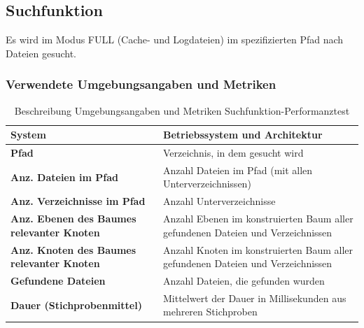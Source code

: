 \documentclass[a4paper,12pt]{report}
\begin{document}
    \subsection{Suchfunktion}\label{subsec:testduchfuhrung}
    Es wird im Modus FULL (Cache- und Logdateien) im spezifizierten Pfad nach Dateien gesucht.

    \subsubsection{Verwendete Umgebungsangaben und Metriken}\label{subsubsec:search-perftest-metrics-title}
    \begin{table}[h!]
        \centering
        \setlength{\leftmargini}{0.8cm}
        \begin{tabular}{|p{7cm}|p{7cm}|}
            \hline
            \textbf{System}                                            & Betriebssystem und Architektur                                                  \\ \hline
            \textbf{Pfad}                                              & Verzeichnis, in dem gesucht wird                                                \\ \hline
            \textbf{Anz. Dateien im Pfad}                              & Anzahl Dateien im Pfad (mit allen Unterverzeichnissen)                          \\ \hline
            \textbf{Anz. Verzeichnisse im Pfad}                        & Anzahl Unterverzeichnisse                                                       \\ \hline
            \textbf{Anz. Ebenen \newline des Baumes relevanter Knoten} & Anzahl Ebenen im konstruierten Baum aller gefundenen Dateien und Verzeichnissen \\ \hline
            \textbf{Anz. Knoten \newline des Baumes relevanter Knoten} & Anzahl Knoten im konstruierten Baum aller gefundenen Dateien und Verzeichnissen \\ \hline
            \textbf{Gefundene Dateien}                                 & Anzahl Dateien, die gefunden wurden                                             \\ \hline
            \textbf{Dauer (Stichprobenmittel)}                         & Mittelwert der Dauer in Millisekunden aus mehreren Stichproben                  \\ \hline
        \end{tabular}
        \caption{Beschreibung Umgebungsangaben und Metriken Suchfunktion-Performanztest}\label{tab:perf-search-metrics}
    \end{table}
\end{document}
